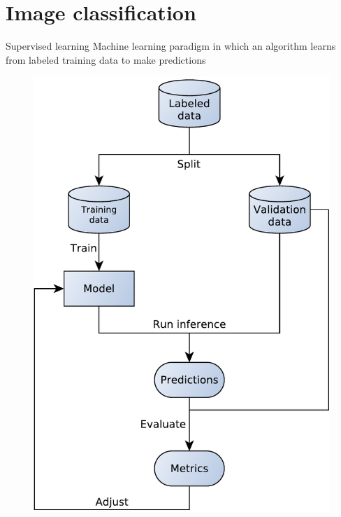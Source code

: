 
\section{Image classification}

\begin{frame}{Supervised learning}
Machine learning paradigm in which an algorithm learns from labeled training
data to make predictions
  \begin{figure}
	\includegraphics[width=\linewidth,height=0.75\textheight,keepaspectratio]{images/supervised_learning.pdf}
  \end{figure}
\end{frame}


